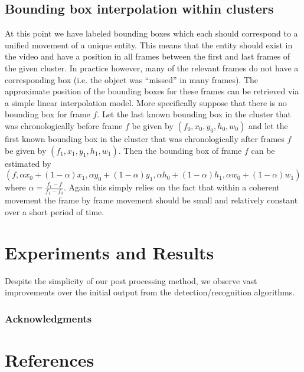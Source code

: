 \documentclass{article}
\begin{document}
\subsection{Bounding box interpolation within clusters}

At this point we have labeled bounding boxes which each should correspond to a unified movement of a unique entity. This means that the entity should exist in the video and have a position in all frames between
the first and last frames of the given cluster. In practice however, many of the relevant frames do not have a corresponding box (i.e. the object was ``missed'' in many frames). The approximate position of the
bounding boxes for these frames can be retrieved via a simple linear interpolation model. More specifically suppose that there is no bounding box for frame $f$. Let the last known bounding box in the cluster 
that was chronologically before frame $f$ be given by $(f_0, x_0, y_0, h_0, w_0)$ and let the first known bounding box in the cluster that was chronologically after frames $f$ be given by 
$(f_1, x_1, y_1, h_1, w_1)$. Then the bounding box of frame $f$ can be estimated by $(f, \alpha x_0 + (1-\alpha)x_1, \alpha y_0 + (1-\alpha)y_1, \alpha h_0 + (1-\alpha)h_1, \alpha w_0 + (1-\alpha)w_1)$
where $\alpha = \frac{f_1-f}{f_1 - f_0}$. Again this simply relies on the fact that within a coherent movement the frame by frame movement should be small and relatively constant over a short period of time.

\section{Experiments and Results}
Despite the simplicity of our post processing method, we observe vast improvements over the initial output from the detection/recognition algorithms.

\subsubsection*{Acknowledgments}

\section*{References}



\end{document}
